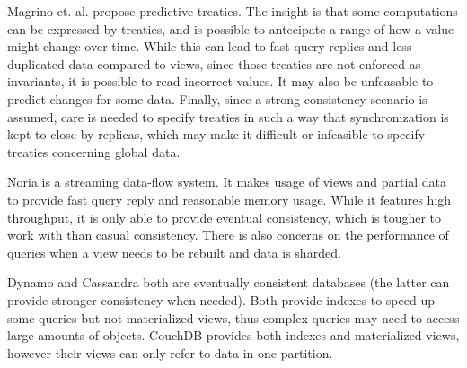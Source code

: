 \documentclass{vldb}
\begin{document}
Magrino et. al. \cite{treaties} propose predictive treaties. 
The insight is that some computations can be expressed by treaties, and is possible to antecipate a range of how a value might change over time.
While this can lead to fast query replies and less duplicated data compared to views, since those treaties are not enforced as invariants, it is possible to read incorrect values.
It may also be unfeasable to predict changes for some data.
Finally, since a strong consistency scenario is assumed, care is needed to specify treaties in such a way that synchronization is kept to close-by replicas, which may make it difficult or infeasible to specify treaties concerning global data.

Noria \cite{noria} is a streaming data-flow system. 
It makes usage of views and partial data to provide fast query reply and reasonable memory usage.
While it features high throughput, it is only able to provide eventual consistency, which is tougher to work with than casual consistency.
There is also concerns on the performance of queries when a view needs to be rebuilt and data is sharded.

Dynamo \cite{dynamo} and Cassandra \cite{cassandra} both are eventually consistent databases (the latter can provide stronger consistency when needed).
Both provide indexes to speed up some queries but not materialized views, thus complex queries may need to access large amounts of objects.
CouchDB \cite{couchDB} provides both indexes and materialized views, however their views can only refer to data in one partition.




\end{document}

